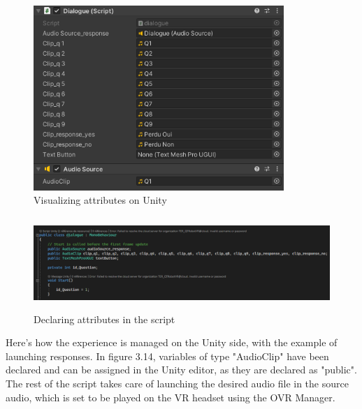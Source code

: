 \begin{figure}[!h]
\centering
\includegraphics[height=7cm]{Figures/UnityDialogue.png}
\caption{Visualizing attributes on Unity}
\end{figure}

\begin{figure}[!h]
\centering
\includegraphics[height=3.5cm]{Figures/VSDialogue.png}
\caption{Declaring attributes in the script}
\end{figure}

\newpage
Here's how the experience is managed on the Unity side, with the example of launching responses. In figure 3.14, variables of type "AudioClip" have been declared and can be assigned in the Unity editor, as they are declared as "public". The rest of the script takes care of launching the desired audio file in the source audio, which is set to be played on the VR headset using the OVR Manager.